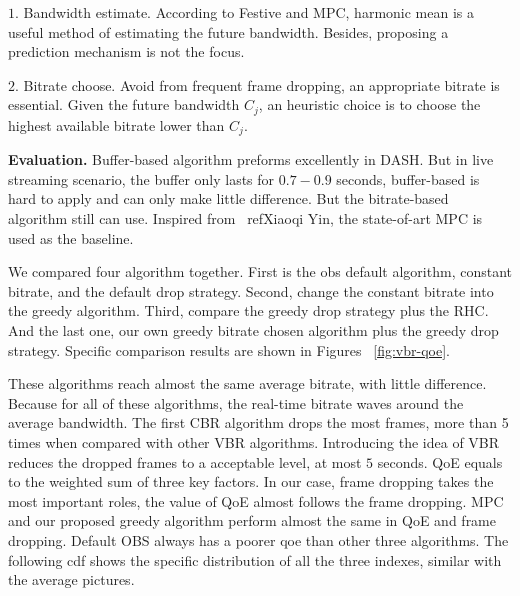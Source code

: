 $1.$ Bandwidth estimate. According to Festive and MPC, harmonic mean is a useful method of estimating the future bandwidth. Besides, proposing a prediction mechanism is not the focus.

$2.$ Bitrate choose. Avoid from frequent frame dropping, an appropriate bitrate is essential. Given the future bandwidth $C_j$, an heuristic choice is to choose the highest available bitrate lower than $C_j$.

\textbf{Evaluation.} Buffer-based algorithm preforms excellently in DASH. But in live streaming scenario, the buffer only lasts for $0.7-0.9$ seconds, buffer-based is hard to apply and can only make little difference. But the bitrate-based algorithm still can use. Inspired from ~ref{Xiaoqi Yin}, the state-of-art MPC is used as the baseline.


We compared four algorithm together. First is the obs default algorithm, constant bitrate, and the default drop strategy. Second, change the constant bitrate into the greedy algorithm. Third, compare the greedy drop strategy plus the RHC. And the last one, our own greedy bitrate chosen algorithm plus the greedy drop strategy. Specific comparison results are shown in Figures ~\ref{fig:vbr-qoe}.

These algorithms reach almost the same average bitrate, with little difference. Because for all of these algorithms, the real-time bitrate waves around the average bandwidth. The first CBR algorithm drops the most frames, more than 5 times when compared with other VBR algorithms. Introducing the idea of VBR reduces the dropped frames to a acceptable level, at most $5$ seconds. QoE equals to the weighted sum of three key factors. In our case, frame dropping takes the most important roles, the value of QoE almost follows the frame dropping. MPC and our proposed greedy algorithm perform almost the same in QoE and frame dropping. Default OBS always has a poorer qoe than other three algorithms. The following cdf shows the specific distribution of all the three indexes, similar with the average pictures.

